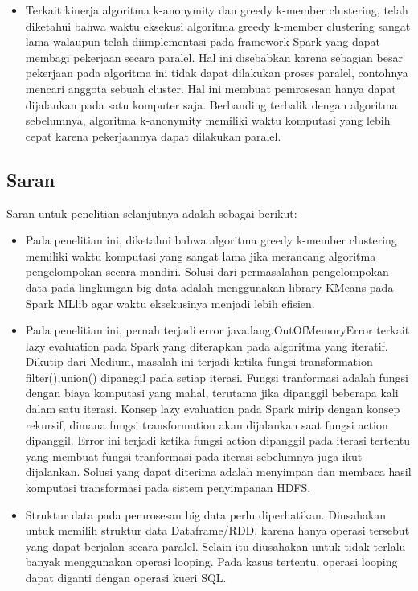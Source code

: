 \begin{itemize}
\item Terkait kinerja algoritma k-anonymity dan greedy k-member clustering, telah diketahui bahwa waktu eksekusi algoritma greedy k-member clustering sangat lama walaupun telah diimplementasi pada framework Spark yang dapat membagi pekerjaan secara paralel. Hal ini disebabkan karena sebagian besar pekerjaan pada algoritma ini tidak dapat dilakukan proses paralel, contohnya mencari anggota sebuah cluster. Hal ini membuat pemrosesan hanya dapat dijalankan pada satu komputer saja. Berbanding terbalik dengan algoritma sebelumnya, algoritma k-anonymity memiliki waktu komputasi yang lebih cepat karena pekerjaannya dapat dilakukan paralel.

\end{itemize}

\subsection{Saran}

Saran untuk penelitian selanjutnya adalah sebagai berikut:

\begin{itemize}

\item Pada penelitian ini, diketahui bahwa algoritma greedy k-member clustering memiliki waktu komputasi yang sangat lama jika merancang algoritma pengelompokan secara mandiri. Solusi dari permasalahan pengelompokan data pada lingkungan big data adalah menggunakan library KMeans pada Spark MLlib agar waktu eksekusinya menjadi lebih efisien.

\item Pada penelitian ini, pernah terjadi error java.lang.OutOfMemoryError terkait lazy evaluation pada Spark yang diterapkan pada algoritma yang iteratif. Dikutip dari Medium, masalah ini terjadi ketika  fungsi transformation filter(),union() dipanggil pada setiap iterasi. Fungsi tranformasi adalah fungsi dengan biaya komputasi yang mahal, terutama jika dipanggil beberapa kali dalam satu iterasi. Konsep lazy evaluation pada Spark mirip dengan konsep rekursif, dimana fungsi transformation akan dijalankan saat fungsi action dipanggil. Error ini terjadi ketika fungsi action dipanggil pada iterasi tertentu yang membuat fungsi tranformasi pada iterasi sebelumnya juga ikut dijalankan. Solusi yang dapat diterima adalah menyimpan dan membaca hasil komputasi transformasi pada sistem penyimpanan HDFS.

\item Struktur data pada pemrosesan big data perlu diperhatikan. Diusahakan untuk memilih struktur data Dataframe/RDD, karena hanya operasi tersebut yang dapat berjalan secara paralel. Selain itu diusahakan untuk tidak terlalu banyak menggunakan operasi looping. Pada kasus tertentu, operasi looping dapat diganti dengan operasi kueri SQL.


\end{itemize}
